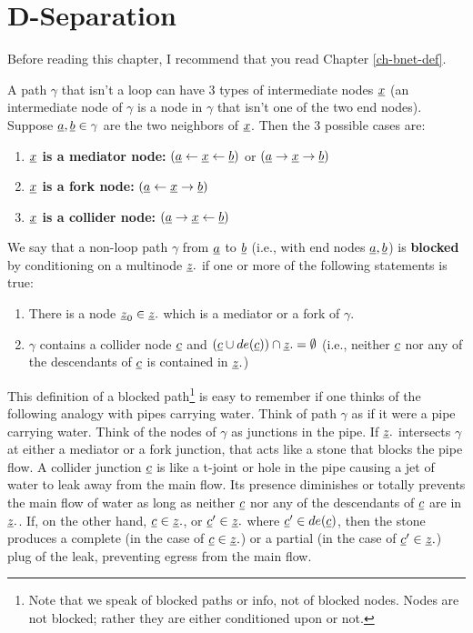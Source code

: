 \chapter{D-Separation}
\label{ch-dsep}
Before reading this chapter,
I  recommend
that you
read
Chapter \ref{ch-bnet-def}.


A path $\gamma$ that
isn't a loop can have 
3 types of intermediate
 nodes $\rvx$ (an intermediate
 node of $\gamma$
 is a node in $\gamma$ that 
isn't one
of the two end nodes).
Suppose $\rva,\rvb\in \gamma$
are the two neighbors of $\rvx$. Then
the 3 possible cases are:
\begin{enumerate}
\item {\bf$\rvx$ is a mediator node:}
$(\rva\larrow\rvx\larrow \rvb)$
or
$(\rva\rarrow\rvx\rarrow \rvb)$
\item {\bf $\rvx$ is a fork node:}
$(\rva\larrow\rvx\rarrow \rvb)$
\item {\bf $\rvx$ is a collider node:}
$(\rva\rarrow\rvx\larrow \rvb)$
\end{enumerate}

We say that a non-loop path 
$\gamma$ 
from $\rva$ to $\rvb$ (i.e., with
end nodes $\rva, \rvb$)
is {\bf blocked}
by conditioning on a multinode $\rvz.$
if one or more 
of the following
statements is true:

\begin{enumerate}
\item 
There is a node $\rvz_0\in \rvz.$
which is a mediator 
or a fork of $\gamma$.
\item
$\gamma$ contains a collider
node $\rvc$
and 
$(\rvc\cup de(\rvc))\cap\rvz.=\emptyset$
(i.e., neither 
$\rvc$ nor 
any of the descendants of $\rvc$
is contained in $\rvz.$)
\end{enumerate}

This definition of a blocked 
path\footnote{Note
that we speak of 
blocked paths or info,
not of blocked nodes.
Nodes are not blocked;
rather they are either 
conditioned upon
or not.}
 is easy to remember
if one thinks 
of the following analogy
with pipes carrying water.
Think of path
$\gamma$ as if it
were a pipe
carrying water.
Think of
the nodes 
of $\gamma$ as junctions in the pipe.
If $\rvz.$
intersects $\gamma$
at either a mediator
or a fork junction,
that acts like a stone
that blocks the pipe flow.
A collider junction $\rvc$
is like a t-joint or hole in the pipe
causing a jet of water to leak away from the main flow.
Its presence
diminishes or totally 
prevents the main flow of  water
as long
as neither
$\rvc$
nor any of
the descendants 
of $\rvc$
are in $\rvz.$.
If,
on the 
other hand,
$\rvc\in\rvz.$,
or $\rvc'\in \rvz.$
where $\rvc'\in de(\rvc)$,
then the stone
produces
a complete
(in the case of $\rvc\in\rvz.$)
or a partial 
(in the case of $\rvc'\in\rvz.$)
plug of the leak,
preventing egress from the main flow.

